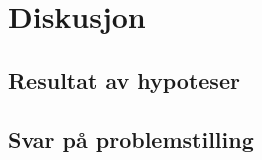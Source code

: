 \section{Diskusjon}

\subsection{Resultat av hypoteser}

\subsection{Svar på problemstilling}

\newpage